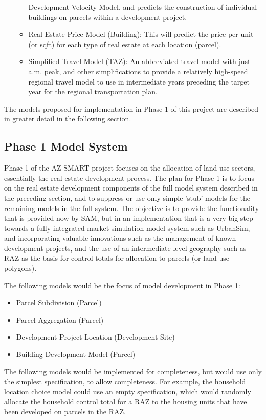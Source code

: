 \begin{itemize}
\begin{itemize}
Development Velocity Model, and predicts the construction of individual
buildings on parcels within a development project.
\item Real Estate Price Model (Building): This will predict the price
per unit (or sqft) for each type of real estate at each location (parcel).
\item Simplified Travel Model (TAZ): An abbreviated travel model with
just a.m. peak, and other simplifications to provide a relatively
high-speed regional travel model to use in intermediate years preceding
the target year for the regional transportation plan.
\end{itemize}
\end{itemize}

The models proposed for implementation in Phase 1 of this project are
described in greater detail in the following section.

\subsection{Phase 1 Model System}
Phase 1 of the AZ-SMART project focuses on the allocation of land use
sectors, essentially the real estate development process.  The plan
for Phase 1 is to focus on the real estate development components of
the full model system described in the preceding section, and to
suppress or use only simple 'stub' models for the remaining models
in the full system.  The objective is to provide the functionality
that is provided now by SAM, but in an implementation that is a
very big step towards a fully integrated market simulation model
system such as UrbanSim, and incorporating valuable innovations
such as the management of known development projects, and the use
of an intermediate level geography such as RAZ as the basis for
control totals for allocation to parcels (or land use polygons).

The following models would be the focus of model development in Phase 1:

\begin{itemize}
\item Parcel Subdivision (Parcel)
\item Parcel Aggregation (Parcel)
\item Development Project Location (Development Site)
\item Building Development Model (Parcel)
\end{itemize}

The following models would be implemented for completeness, but would
use only the simplest specification, to allow completeness.  For example,
the household location choice model could use an empty specification,
which would randomly allocate the household control total for a RAZ to
the housing units that have been developed on parcels in the RAZ.

